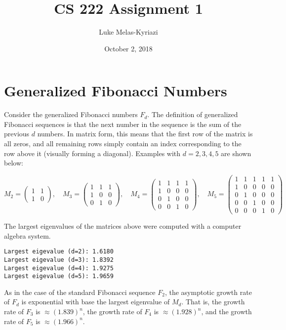 \documentclass[11pt,letterpaper]{article}
\title{CS 222 Assignment 1}
\author{Luke Melas-Kyriazi}
\date{October 2, 2018}
\begin{document}
\maketitle

\section{Generalized Fibonacci Numbers}
Consider the generalized Fibonacci numbers $F_d$. The definition of generalized Fibonacci sequences is that the next number in the sequence is the sum of the previous $d$ numbers. In matrix form, this means that the first row of the matrix is all zeros, and all remaining rows simply contain an index corresponding to the row above it (visually forming a diagonal). Examples with $d=2,3,4,5$ are shown below:

\[ M_2 = \begin{pmatrix} 1 & 1 \\ 1 & 0 \end{pmatrix}, \quad
   M_3 = \begin{pmatrix} 1 & 1 & 1 \\ 1 & 0 & 0 \\ 0 & 1 & 0 \end{pmatrix}, \quad
   M_4 = \begin{pmatrix} 1 & 1 & 1 & 1 \\ 1 & 0 & 0 & 0 \\ 0 & 1 & 0 & 0 \\ 0 & 0 & 1 & 0  \end{pmatrix}, \quad
   M_5 = \begin{pmatrix} 1 & 1 & 1 & 1 & 1 \\ 1 & 0 & 0 & 0 & 0 \\ 0 & 1 & 0 & 0 & 0 \\ 0 & 0 & 1 & 0 & 0 \\ 0 & 0 & 0 & 1 & 0 \end{pmatrix}
\]

The largest eigenvalues of the matrices above were computed with a computer algebra system.

\begin{center}
\texttt{Largest eigevalue (d=2): 1.6180} \\
\texttt{Largest eigevalue (d=3): 1.8392} \\
\texttt{Largest eigevalue (d=4): 1.9275} \\
\texttt{Largest eigevalue (d=5): 1.9659}
\end{center}

As in the case of the standard Fibonacci sequence $F_2$, the asymptotic growth rate of $F_d$ is exponential with base the largest eigenvalue of $M_d$. That is, the growth rate of $F_3$ is $\approx (1.839)^n$, the growth rate of $F_4$ is $\approx (1.928)^n$, and the growth rate of $F_5$ is $\approx (1.966)^n$.
\end{document}
